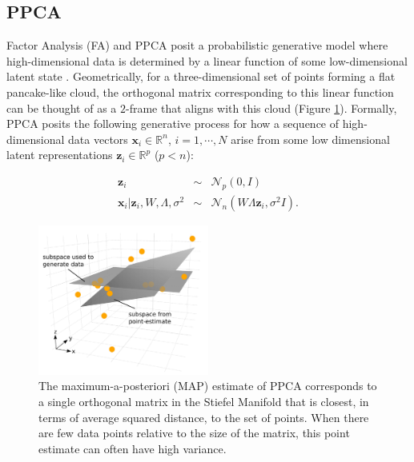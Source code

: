 \documentclass[ba]{imsart}
\newcommand{\mb}[1]{\mathbf{#1}}
\numberwithin{equation}{section}
\theoremstyle{plain}
\begin{document}
\subsection{PPCA}
Factor Analysis (FA) and PPCA \citep{tipping1999probabilistic} posit a probabilistic generative model where high-dimensional data is determined by a linear function of some low-dimensional latent state \cite[Chapt.~12]{murphy2012machine}. Geometrically, for a three-dimensional set of points forming a flat pancake-like cloud, the orthogonal matrix corresponding to this linear function can be thought of as a $2$-frame that aligns with this cloud (Figure \ref{fig:MleSubspaceEstimate}). Formally, PPCA posits the following generative process for how a sequence of high-dimensional data vectors $\mathbf{x}_i \in \mathbb{R}^n$, $i = 1, \cdots, N$ arise from some low dimensional latent representations $\mathbf{z}_i \in \mathbb{R}^p$ ($p < n$):

\begin{eqnarray}
\label{eq:PpcaGenerativeProcess}
\mb{z}_i &\sim& \mathcal{N}_p(0, I) \nonumber\\
\mb{x}_i | \mb{z}_i, W, \Lambda, \sigma^2 &\sim& \mathcal{N}_n(W \Lambda \mb{z}_i, \sigma^2 I).
\end{eqnarray}

\begin{figure}[h]
\centering
\vspace{.1in}
\includegraphics[width=0.5\textwidth]{figures/uncertainty_atz.pdf}
\vspace{.05in}
\caption{The maximum-a-posteriori (MAP) estimate of PPCA corresponds to a single orthogonal matrix in the Stiefel Manifold that is closest, in terms of average squared distance, to the set of points. When there are few data points relative to the size of the matrix, this point estimate can often have high variance.}
\label{fig:MleSubspaceEstimate}
\end{figure}
\end{document}
